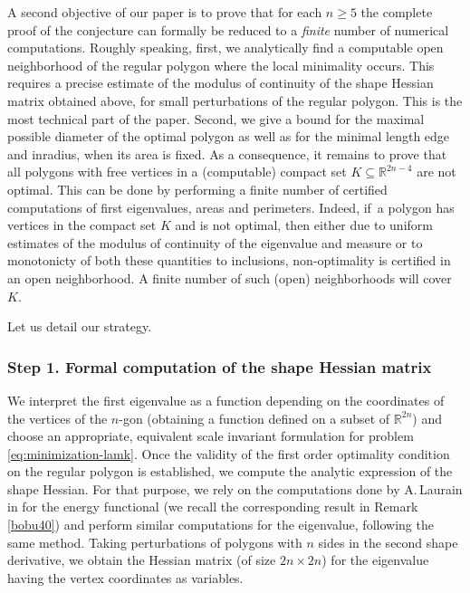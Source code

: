 \documentclass[JEP,XML,SOM,Unicode,ThmDefs,NoFloatCountersInSection,published]{cedram}
\theoremstyle{plain}
\theoremstyle{definition}
\def\R{\mathbb{R}}
\newcommand{\sq}{\subseteq}
\begin{document}
A second objective of our paper is to prove that for each $n \ge 5$ the complete proof of the conjecture can formally be reduced to a {\it finite} number of numerical computations. Roughly speaking, first, we analytically
find a computable open neighborhood of the regular polygon where the {local} minimality occurs. This requires a precise estimate of the modulus of continuity of the shape Hessian matrix obtained above, for small perturbations of the regular polygon. This is the most technical part of the paper. Second, we give a bound for the maximal possible diameter of the optimal polygon as well as for the minimal length edge and inradius, when its area is fixed. As a consequence, {it remains} to prove that all polygons with free vertices in a (computable) compact set $K \sq \R^{2n-4}$ are not optimal. This can be done by performing a finite number of certified computations of first eigenvalues, areas and perimeters. Indeed, if~a polygon has vertices in the compact set $K$ and is not optimal, then either due to uniform estimates of the modulus of continuity of the eigenvalue and measure or to monotonicty of both these quantities to inclusions, non-optimality is certified in an open neighborhood. A finite number of such (open) neighborhoods will cover $K$. 

Let us detail our strategy.

\subsubsection*{Step 1. Formal computation of the shape Hessian matrix}
We interpret the first eigenvalue as a function depending on the coordinates of the vertices of the $n$-gon (obtaining a function defined on a subset of $\R^{2n}$) and choose an appropriate, equivalent scale invariant formulation for problem \eqref{eq:minimization-lamk}. Once the validity of the first order optimality condition on the regular polygon is established, we compute the analytic expression of the shape Hessian. For that purpose, we rely on the computations done by A.\,Laurain in \cite{laurain2ndDeriv} for the energy functional (we recall the corresponding result in Remark \ref{bobu40}) and perform similar computations for the eigenvalue, following the same method.
Taking perturbations of
polygons with $n$ sides in the second shape derivative, we obtain the Hessian matrix (of size $2n\times 2n$) for the eigenvalue having the vertex coordinates as variables.
\end{document}
